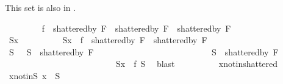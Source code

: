 \begin{isabellebody}
\begin{isamarkuptext}
This set is also in .%
\end{isamarkuptext}\isamarkuptrue%
\ \ \ \ \ \ \isamarkupfalse%
\ {}{\isacharcolon}{\kern0pt}\ {\isachardoublequoteopen}{\isacharquery}{\kern0pt}f\ {\isacharbackquote}{\kern0pt}\ {\isacharparenleft}{\kern0pt}shattered{\isacharunderscore}{\kern0pt}by\ {\isacharquery}{\kern0pt}F{}\ {\isasyminter}\ shattered{\isacharunderscore}{\kern0pt}by\ {\isacharquery}{\kern0pt}F{}{\isacharparenright}{\kern0pt}\ {\isasymsubseteq}\ shattered{\isacharunderscore}{\kern0pt}by\ F{\isachardoublequoteclose}\isanewline
\ \ \ \ \ \ \isamarkupfalse%
\ \isanewline
\ \ \ \ \ \ \ \ \isamarkupfalse%
\ S{\isacharunderscore}{\kern0pt}x\isanewline
\ \ \ \ \ \ \ \ \isamarkupfalse%
\ {\isachardoublequoteopen}S{\isacharunderscore}{\kern0pt}x\ {\isasymin}\ {\isacharquery}{\kern0pt}f\ {\isacharbackquote}{\kern0pt}\ {\isacharparenleft}{\kern0pt}shattered{\isacharunderscore}{\kern0pt}by\ {\isacharquery}{\kern0pt}F{}\ {\isasyminter}\ shattered{\isacharunderscore}{\kern0pt}by\ {\isacharquery}{\kern0pt}F{}{\isacharparenright}{\kern0pt}{\isachardoublequoteclose}\isanewline
\ \ \ \ \ \ \ \ \isamarkupfalse%
\ \isamarkupfalse%
\ S\ \ {}{}{\isacharcolon}{\kern0pt}\ {\isachardoublequoteopen}S\ {\isasymin}\ shattered{\isacharunderscore}{\kern0pt}by\ {\isacharquery}{\kern0pt}F{}{\isachardoublequoteclose}\ \isanewline
\ \ \ \ \ \ \ \ \ \ \ \ \ \ \ \ \ \ \ \ \ \ \ \ \ {}{}{\isacharcolon}{\kern0pt}\ {\isachardoublequoteopen}S\ {\isasymin}\ shattered{\isacharunderscore}{\kern0pt}by\ {\isacharquery}{\kern0pt}F{}{\isachardoublequoteclose}\ \isanewline
\ \ \ \ \ \ \ \ \ \ \ \ \ \ \ \ \ \ \ \ \ \ \ \ \ {}{}{\isacharcolon}{\kern0pt}\ {\isachardoublequoteopen}S{\isacharunderscore}{\kern0pt}x\ {\isacharequal}{\kern0pt}\ {\isacharquery}{\kern0pt}f\ S{\isachardoublequoteclose}\ \isamarkupfalse%
\ blast\isanewline
\ \ \ \ \ \ \ \ \isamarkupfalse%
\ x{\isacharunderscore}{\kern0pt}not{\isacharunderscore}{\kern0pt}in{\isacharunderscore}{\kern0pt}shattered\ {}{}\ \isamarkupfalse%
\ x{\isacharunderscore}{\kern0pt}not{\isacharunderscore}{\kern0pt}in{\isacharunderscore}{\kern0pt}S{\isacharcolon}{\kern0pt}\ {\isachardoublequoteopen}x\ {\isasymnotin}\ S{\isachardoublequoteclose}\ \isamarkupfalse%

\end{isabellebody}
